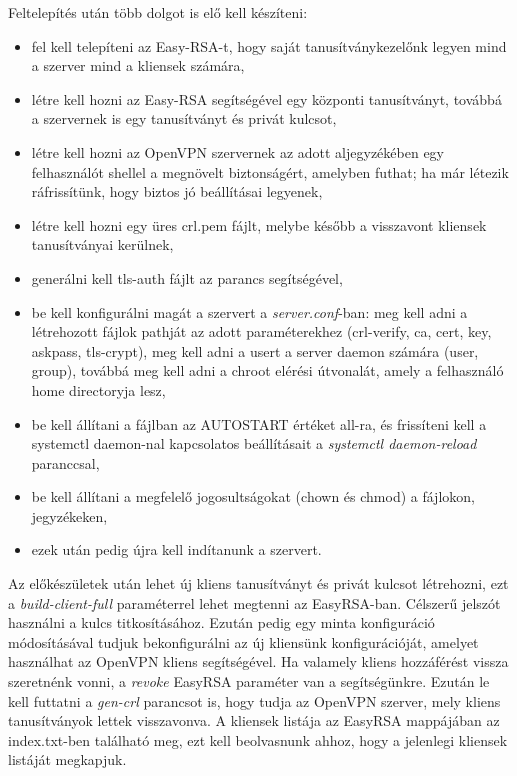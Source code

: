 Feltelepítés után több dolgot is elő kell készíteni:
\begin{itemize}
	\item fel kell telepíteni az Easy-RSA-t, hogy saját tanusítványkezelőnk legyen mind a szerver mind a kliensek számára,
	\item létre kell hozni az Easy-RSA segítségével egy központi tanusítványt, továbbá a szervernek is egy tanusítványt és privát kulcsot,
	\item létre kell hozni az OpenVPN szervernek az \textit{} adott aljegyzékében egy felhasználót \textit{} shellel a megnövelt biztonságért, amelyben futhat; ha már létezik ráfrissítünk, hogy biztos jó beállításai legyenek,
	\item létre kell hozni egy üres crl.pem fájlt, melybe később a visszavont kliensek tanusítványai kerülnek,
	\item generálni kell tls-auth fájlt az \textit{} parancs segítségével,
	\item be kell konfigurálni magát a szervert a \textit{server.conf}-ban: meg kell adni a létrehozott fájlok pathját az adott paraméterekhez (crl-verify, ca, cert, key, askpass, tls-crypt), meg kell adni a usert a server daemon számára (user, group), továbbá meg kell adni a chroot elérési útvonalát, amely a felhasználó home directoryja lesz,
	\item be kell állítani a \textit{} fájlban az AUTOSTART értéket all-ra, és frissíteni kell a systemctl daemon-nal kapcsolatos beállításait a \textit{systemctl daemon-reload} paranccsal,
	\item be kell állítani a megfelelő jogosultságokat (chown és chmod) a fájlokon, jegyzékeken,
	\item ezek után pedig újra kell indítanunk a szervert.
\end{itemize}

Az előkészületek után lehet új kliens tanusítványt és privát kulcsot létrehozni, ezt a \textit{build-client-full} paraméterrel lehet megtenni az EasyRSA-ban. Célszerű jelszót használni a kulcs titkosításához. Ezután pedig egy minta konfiguráció módosításával tudjuk bekonfigurálni az új kliensünk konfigurációját, amelyet használhat az OpenVPN kliens segítségével. Ha valamely kliens hozzáférést vissza szeretnénk vonni, a \textit{revoke} EasyRSA paraméter van a segítségünkre. Ezután le kell futtatni a \textit{gen-crl} parancsot is, hogy tudja az OpenVPN szerver, mely kliens tanusítványok lettek visszavonva. A kliensek listája az EasyRSA mappájában az index.txt-ben található meg, ezt kell beolvasnunk ahhoz, hogy a jelenlegi kliensek listáját megkapjuk.

